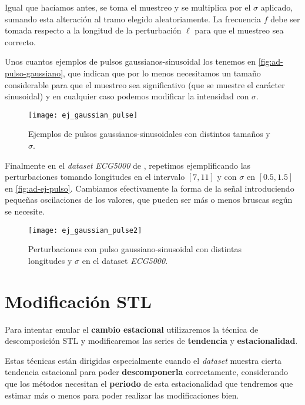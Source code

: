 Igual que hacíamos antes, se toma el muestreo y se multiplica por el $\sigma$ aplicado, sumando esta alteración al tramo elegido aleatoriamente. La frecuencia $f$ debe ser tomada respecto a la longitud de la perturbación $\ell$ para que el muestreo sea correcto.

Unos cuantos ejemplos de pulsos gaussianos-sinusoidal los tenemos en \autoref{fig:ad-pulso-gaussiano}, que indican que por lo menos necesitamos un tamaño considerable para que el muestreo sea significativo (que se muestre el carácter sinusoidal) y en cualquier caso podemos modificar la intensidad con $\sigma$.

\begin{figure}[htpb]
  \centering
  \texttt{[image: ej\_gaussian\_pulse]}
  \caption{Ejemplos de pulsos gaussianos-sinusoidales con distintos tamaños y $\sigma$.}
  \label{fig:ad-pulso-gaussiano}
\end{figure}

Finalmente en el \emph{dataset} \emph{ECG5000} de \cite{bagnall2020ts}, repetimos ejemplificando las perturbaciones tomando longitudes en el intervalo $[7, 11]$ y con $\sigma$ en $[0.5, 1.5]$ en \autoref{fig:ad-ej-pulso}. Cambiamos efectivamente la forma de la señal introduciendo pequeñas oscilaciones de los valores, que pueden ser más o menos bruscas según se necesite.

\begin{figure}[htpb]
  \centering
  \texttt{[image: ej\_gaussian\_pulse2]}
  \caption{Perturbaciones con pulso gaussiano-sinusoidal con distintas longitudes y $\sigma$ en el dataset \emph{ECG5000}.}
  \label{fig:ad-ej-pulso}
\end{figure}

\section{Modificación STL}

Para intentar emular el \textbf{cambio estacional} utilizaremos la técnica de descomposición STL y modificaremos las series de \textbf{tendencia} y \textbf{estacionalidad}.

Estas técnicas están dirigidas especialmente cuando el \emph{dataset} muestra cierta tendencia estacional para poder \textbf{descomponerla} correctamente, considerando que los métodos necesitan el \textbf{periodo} de esta estacionalidad que tendremos que estimar más o menos para poder realizar las modificaciones bien.

